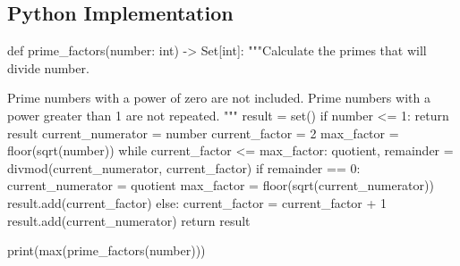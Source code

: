 \documentclass{article}
\begin{document}
\subsection*{Python Implementation}

\begin{pyverbatim}[][frame=single]
def prime_factors(number: int) -> Set[int]:
    """Calculate the primes that will divide number.

    Prime numbers with a power of zero are not included.
    Prime numbers with a power greater than 1 are not repeated.
    """
    result = set()
    if number <= 1:
        return result
    current_numerator = number
    current_factor = 2
    max_factor = floor(sqrt(number))
    while current_factor <= max_factor:
        quotient, remainder = divmod(current_numerator,
                                     current_factor)
        if remainder == 0:
            current_numerator = quotient
            max_factor = floor(sqrt(current_numerator))
            result.add(current_factor)
        else:
            current_factor = current_factor + 1
    result.add(current_numerator)
    return result

print(max(prime_factors(number)))
\end{pyverbatim}
\end{document}
